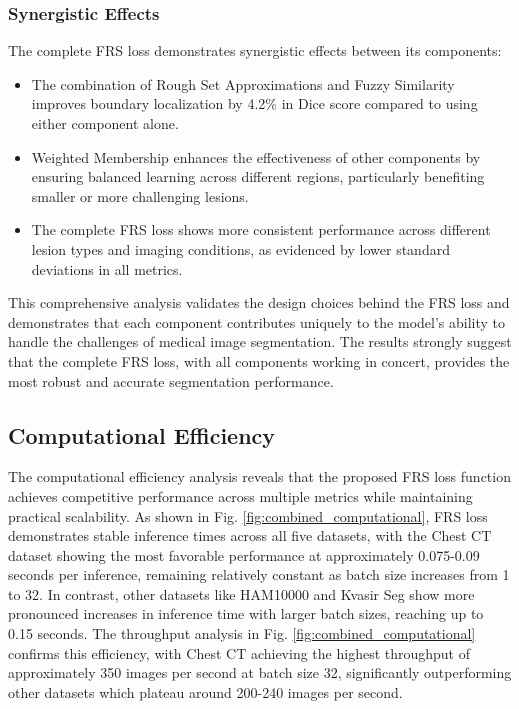 \documentclass[review]{elsarticle}
\begin{document}
\subsubsection{Synergistic Effects}
The complete FRS loss demonstrates synergistic effects between its components:

\begin{itemize}
	\item The combination of Rough Set Approximations and Fuzzy Similarity improves boundary localization by 4.2\% in Dice score compared to using either component alone.
	\item Weighted Membership enhances the effectiveness of other components by ensuring balanced learning across different regions, particularly benefiting smaller or more challenging lesions.
	\item The complete FRS loss shows more consistent performance across different lesion types and imaging conditions, as evidenced by lower standard deviations in all metrics.
\end{itemize}

This comprehensive analysis validates the design choices behind the FRS loss and demonstrates that each component contributes uniquely to the model's ability to handle the challenges of medical image segmentation. The results strongly suggest that the complete FRS loss, with all components working in concert, provides the most robust and accurate segmentation performance.

\subsection{Computational Efficiency}
The computational efficiency analysis reveals that the proposed FRS loss function achieves competitive performance across multiple metrics while maintaining practical scalability. As shown in Fig. \ref{fig:combined_computational}, FRS loss demonstrates stable inference times across all five datasets, with the Chest CT dataset showing the most favorable performance at approximately 0.075-0.09 seconds per inference, remaining relatively constant as batch size increases from 1 to 32. In contrast, other datasets like HAM10000 and Kvasir Seg show more pronounced increases in inference time with larger batch sizes, reaching up to 0.15 seconds. The throughput analysis in Fig. \ref{fig:combined_computational} confirms this efficiency, with Chest CT achieving the highest throughput of approximately 350 images per second at batch size 32, significantly outperforming other datasets which plateau around 200-240 images per second. 
\end{document}
